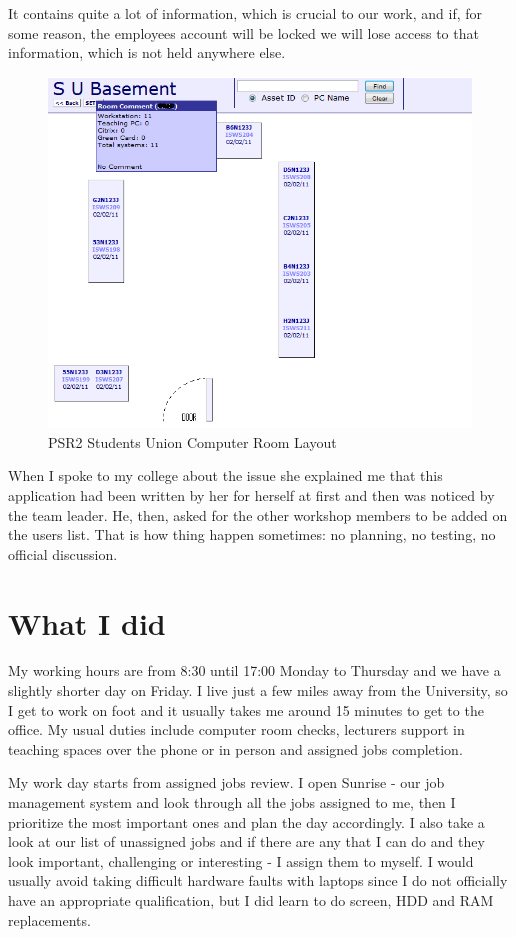 \documentclass[10pt,a4paper,headinclude=true]{report}
\begin{document}
It contains quite a lot of information, which is crucial to our work, and if, for some reason, the employees account will be locked we will lose access to that information, which is not held anywhere else.

\begin{figure}[H]
\includegraphics[scale=0.5]{./PSR2_SU_Room_layout}
\caption{PSR2 Students Union Computer Room Layout}
\label{fig:PSR2_SU_Room_layout}
\end{figure}

When I spoke to my college about the issue she explained me that this application had been written by her for herself at first and then was noticed by the team leader. He, then, asked for the other workshop members to be added on the users list. That is how thing happen sometimes: no planning, no testing, no official discussion.
\chapter{What I did}
My working hours are from 8:30 until 17:00 Monday to Thursday and we have a slightly shorter day on Friday. I live just a few miles away from the University, so I get to work on foot and it usually takes me around 15 minutes to get to the office. My usual duties include computer room checks, lecturers support in teaching spaces over the phone or in person and assigned jobs completion.

My work day starts from assigned jobs review. I open Sunrise - our job management system and look through all the jobs assigned to me, then I prioritize the most important ones and plan the day accordingly. I also take a look at our list of unassigned jobs and if there are any that I can do and they look important, challenging or interesting - I assign them to myself. I would usually avoid taking difficult hardware faults with laptops since I do not officially have an appropriate qualification, but I did learn to do screen, HDD and RAM replacements. 
\end{document}
